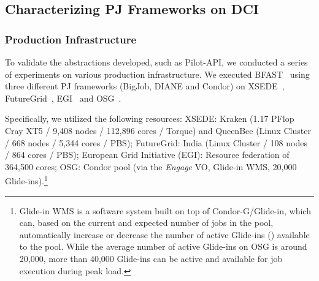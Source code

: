 \documentclass{sig-alternate}
\begin{document}
\subsection{Characterizing PJ Frameworks on DCI}
\label{sec:fg-xsede-osg-egi}


\subsubsection*{Production Infrastructure} 

To validate the abstractions developed,
such as Pilot-API, we conducted a series of
experiments on various production infrastructure. We executed
BFAST~\cite{bfast2009} using three different PJ frameworks (BigJob,
DIANE and Condor) on XSEDE~\cite{xsede}, FutureGrid~\cite{fg},
EGI~\cite{egi} and OSG~\cite{1742-6596-78-1-012057}.

Specifically, we utilized the following resources: XSEDE: Kraken (1.17
PFlop Cray XT5 / 9,408 nodes / 112,896 cores / Torque) and QueenBee
(Linux Cluster / 668 nodes / 5,344 cores / PBS); FutureGrid:
India (Linux Cluster / 108 nodes / 864 cores / PBS); European Grid
Initiative (EGI): Resource federation of 364,500 cores;
OSG: Condor pool (via the \textit{Engage} VO, Glide-in WMS,
20,000 Glide-ins).\footnote{Glide-in WMS is a software system built on
top of Condor-G/Glide-in, which can, based on the current and expected
number of jobs in the pool,  automatically increase or decrease the
number of active Glide-ins (\pilots) available to the pool.  While the
average number of active Glide-ins on OSG is around 20,000, more than
40,000 Glide-ins can be active and available for job execution during
peak load.}

 
\end{document}
